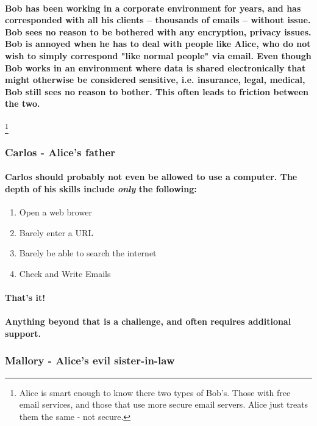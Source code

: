 \paragraph{Bob has been working in a corporate environment for years, and has corresponded with all his clients -- thousands of emails -- without issue. Bob sees no reason to be bothered with any encryption, privacy issues. Bob is annoyed when he has to deal with people like Alice, who do not wish to simply correspond "like normal people" via email. Even though Bob works in an environment where data is shared electronically that might otherwise be considered sensitive, i.e. insurance, legal, medical, Bob still sees no reason to bother. This often leads to friction between the two.}
\footnote{Alice is smart enough to know there two types of Bob's. Those with free email services, and those that use more secure email servers. Alice just treats them the same - not secure.}

\subsubsection{Carlos - Alice's father}
\paragraph{Carlos should probably not even be allowed to use a computer. The depth of his skills include \emph{only} the following:}

\begin{enumerate}
\item Open a web brower
\item Barely enter a URL 
\item Barely be able to search the internet
\item Check and Write Emails
\end{enumerate}

\paragraph{That's it!}
\paragraph{Anything beyond that is a challenge, and often requires additional support.}

\subsubsection{Mallory - Alice's evil sister-in-law}
